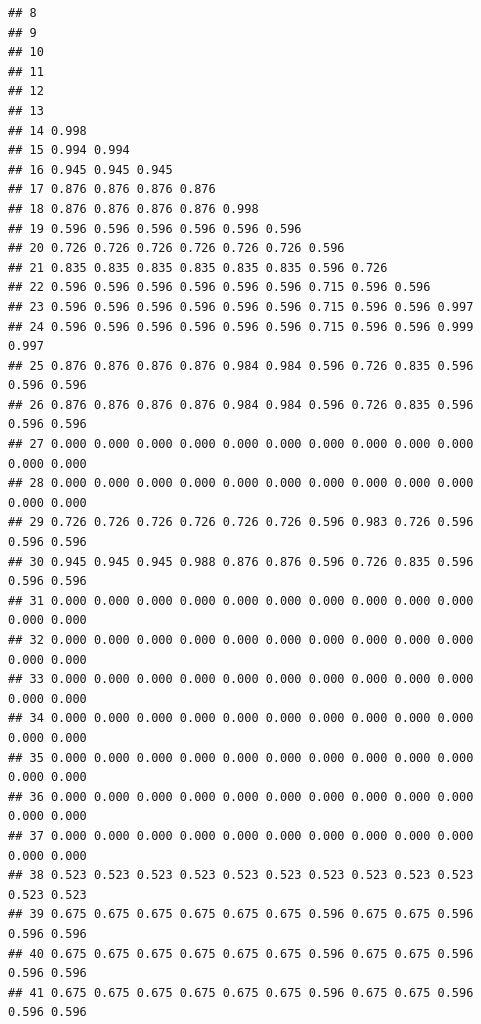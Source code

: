 \documentclass[
]{book}
\begin{document}
\begin{verbatim}
## 8                                                                         
## 9                                                                         
## 10                                                                        
## 11                                                                        
## 12                                                                        
## 13                                                                        
## 14 0.998                                                                  
## 15 0.994 0.994                                                            
## 16 0.945 0.945 0.945                                                      
## 17 0.876 0.876 0.876 0.876                                                
## 18 0.876 0.876 0.876 0.876 0.998                                          
## 19 0.596 0.596 0.596 0.596 0.596 0.596                                    
## 20 0.726 0.726 0.726 0.726 0.726 0.726 0.596                              
## 21 0.835 0.835 0.835 0.835 0.835 0.835 0.596 0.726                        
## 22 0.596 0.596 0.596 0.596 0.596 0.596 0.715 0.596 0.596                  
## 23 0.596 0.596 0.596 0.596 0.596 0.596 0.715 0.596 0.596 0.997            
## 24 0.596 0.596 0.596 0.596 0.596 0.596 0.715 0.596 0.596 0.999 0.997      
## 25 0.876 0.876 0.876 0.876 0.984 0.984 0.596 0.726 0.835 0.596 0.596 0.596
## 26 0.876 0.876 0.876 0.876 0.984 0.984 0.596 0.726 0.835 0.596 0.596 0.596
## 27 0.000 0.000 0.000 0.000 0.000 0.000 0.000 0.000 0.000 0.000 0.000 0.000
## 28 0.000 0.000 0.000 0.000 0.000 0.000 0.000 0.000 0.000 0.000 0.000 0.000
## 29 0.726 0.726 0.726 0.726 0.726 0.726 0.596 0.983 0.726 0.596 0.596 0.596
## 30 0.945 0.945 0.945 0.988 0.876 0.876 0.596 0.726 0.835 0.596 0.596 0.596
## 31 0.000 0.000 0.000 0.000 0.000 0.000 0.000 0.000 0.000 0.000 0.000 0.000
## 32 0.000 0.000 0.000 0.000 0.000 0.000 0.000 0.000 0.000 0.000 0.000 0.000
## 33 0.000 0.000 0.000 0.000 0.000 0.000 0.000 0.000 0.000 0.000 0.000 0.000
## 34 0.000 0.000 0.000 0.000 0.000 0.000 0.000 0.000 0.000 0.000 0.000 0.000
## 35 0.000 0.000 0.000 0.000 0.000 0.000 0.000 0.000 0.000 0.000 0.000 0.000
## 36 0.000 0.000 0.000 0.000 0.000 0.000 0.000 0.000 0.000 0.000 0.000 0.000
## 37 0.000 0.000 0.000 0.000 0.000 0.000 0.000 0.000 0.000 0.000 0.000 0.000
## 38 0.523 0.523 0.523 0.523 0.523 0.523 0.523 0.523 0.523 0.523 0.523 0.523
## 39 0.675 0.675 0.675 0.675 0.675 0.675 0.596 0.675 0.675 0.596 0.596 0.596
## 40 0.675 0.675 0.675 0.675 0.675 0.675 0.596 0.675 0.675 0.596 0.596 0.596
## 41 0.675 0.675 0.675 0.675 0.675 0.675 0.596 0.675 0.675 0.596 0.596 0.596

\end{verbatim}
\end{document}
